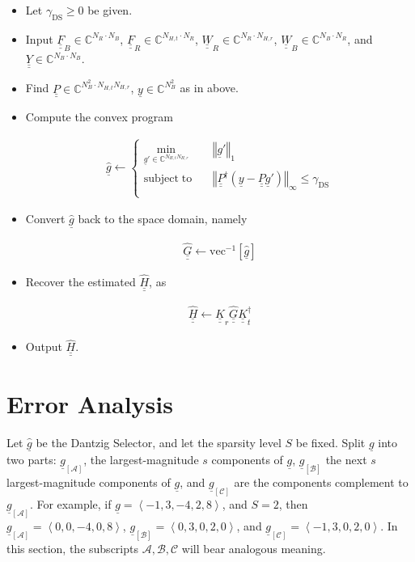 \documentclass[journal]{IEEEtran}
\newcommand {\g} {\gamma}
\newcommand {\D} {\cdot}
\newcommand {\m} [1] {\( #1 \)}
\newcommand {\V} [1] {\underline {#1}}
\newcommand {\M} [1] {\underline {\underline {#1}}}
\newcommand {\RB} [1] {\left( #1 \right)}
\newcommand {\SB} [1] {\left[ #1 \right]}
\newcommand {\VNm} [1] {\left \Vert #1 \right \Vert}
\newcommand {\Min} [1] {\underset {#1} {\mathrm {min}}\;}
\newcommand {\IP} [1] {\left \langle #1 \right \rangle}
\newcommand {\Disp} [1] {
   \begin {align*}
      #1
   \end {align*}
}
\begin{document}
\begin {itemize}
\item Let \m {\g_{\mathrm {DS}} \geq 0} be given.
\item Input \m {\M {F} _B \in \mathbb {C} ^{N_R \D N_B}},
\m {\M {F} _R \in \mathbb {C} ^{N_{H,t} \D N_R}},
\m {\M {W} _R \in \mathbb {C} ^{N_R \D N_{H,r}}},
\m {\M {W} _B \in \mathbb {C} ^{N_B \D N_R}},
and \m {\M {Y} \in \mathbb {C} ^{N_B \D N_B}}.
\item Find \m {\M {P} \in \mathbb {C} ^{N_B ^2 \D N_{H,t} N_{H,r}}}, \m {\V {y} \in \mathbb {C} ^{N_B ^2}} as in above.
\item Compute the convex program
\Disp {
\hat {\V {g}}
\leftarrow \begin {cases}
\Min {\V {g}' \in \mathbb {C} ^{N_{H,t} N_{H,r}}} & \VNm {\V {g}'} _1 \\
\mathrm {subject} \; \mathrm {to} \quad & \VNm {\M {P}^\dagger \RB {\V {y} -\M {P} \V {g}'}} _\infty \leq \g_{\mathrm {DS}} \\
\end {cases} 
}
\item Convert \m {\hat {\V {g}}} back to the space domain, namely
\Disp {
\hat {\M {G}}
\leftarrow \mathrm {vec}^{-1} \SB {\hat {\V {g}}} 
}
\item Recover the estimated \m {\hat {\M {H}}}, as
\Disp {
\hat {\M {H}}
\leftarrow \M {K} _r \hat {\M {G}} \M {K}^\dagger _t
}
\item Output \m {\hat {\M {H}}}.
\end {itemize}


\section{Error Analysis}

Let \m {\hat {\V {g}}} be the Dantzig Selector, and let the sparsity level \m {S} be fixed.
Split \m {\V {g}} into two parts: \m {\V {g} _{\SB{\mathcal {A}}}}, the largest-magnitude \m {s} components of \m {\V {g}}, \m {\V {g} _{\SB{\mathcal {B}}}} the next \m {s} largest-magnitude components of \m {\V {g}}, and \m {\V {g} _{\SB{\mathcal {C}}}} are the components complement to \m {\V {g} _{\SB{\mathcal {A}}}}.
For example, if \m {\V {g} =\IP {-1,3,-4,2,8}}, and \m {S=2}, then \m {\V {g} _{\SB{\mathcal {A}}} =\IP {0,0,-4,0,8}}, \m {\V {g} _{\SB{\mathcal {B}}} =\IP {0,3,0,2,0}}, and \m {\V {g} _{\SB{\mathcal {C}}} =\IP {-1,3,0,2,0}}.
In this section, the subscripts \m {\mathcal {A}, \mathcal {B}, \mathcal {C}} will bear analogous meaning.
\end{document}
